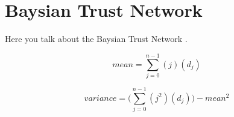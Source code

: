 \section{Baysian Trust Network}
Here you talk about the Baysian Trust Network \cite{btrust}.

\begin{figure}[h]
\begin{equation}
mean = \sum_{j=0}^{n-1}{(j)(d_j)}
\end{equation}
\end{figure}

\begin{figure}[h]
\begin{equation}
variance = \bigg(\sum_{j=0}^{n-1}{(j^2)(d_j)} \bigg) - mean^2
\end{equation}
\end{figure}

